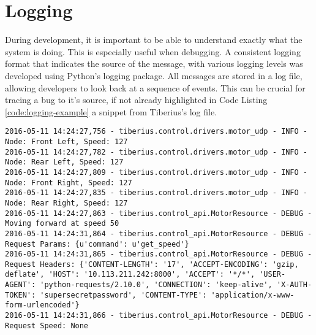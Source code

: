 \section{Logging}
\pagestyle{cameron}

During development, it is important to be able to understand exactly what the system is doing. This is especially useful when debugging. 
\newline
A consistent logging format that indicates the source of the message, with various logging levels was developed using Python's logging package.
\newline
All messages are stored in a log file, allowing developers to look back at a sequence of events. This can be crucial for tracing a bug to it's source, if not already highlighted in Code Listing \ref{code:logging-example} a snippet from Tiberius's log file. 


\begin{lstlisting}[label=code:logging-example]
2016-05-11 14:24:27,756 - tiberius.control.drivers.motor_udp - INFO - Node: Front Left, Speed: 127
2016-05-11 14:24:27,782 - tiberius.control.drivers.motor_udp - INFO - Node: Rear Left, Speed: 127
2016-05-11 14:24:27,809 - tiberius.control.drivers.motor_udp - INFO - Node: Front Right, Speed: 127
2016-05-11 14:24:27,835 - tiberius.control.drivers.motor_udp - INFO - Node: Rear Right, Speed: 127
2016-05-11 14:24:27,863 - tiberius.control_api.MotorResource - DEBUG - Moving forward at speed 50
2016-05-11 14:24:31,864 - tiberius.control_api.MotorResource - DEBUG - Request Params: {u'command': u'get_speed'}
2016-05-11 14:24:31,865 - tiberius.control_api.MotorResource - DEBUG - Request Headers: {'CONTENT-LENGTH': '17', 'ACCEPT-ENCODING': 'gzip, deflate', 'HOST': '10.113.211.242:8000', 'ACCEPT': '*/*', 'USER-AGENT': 'python-requests/2.10.0', 'CONNECTION': 'keep-alive', 'X-AUTH-TOKEN': 'supersecretpassword', 'CONTENT-TYPE': 'application/x-www-form-urlencoded'}
2016-05-11 14:24:31,866 - tiberius.control_api.MotorResource - DEBUG - Request Speed: None
\end{lstlisting}